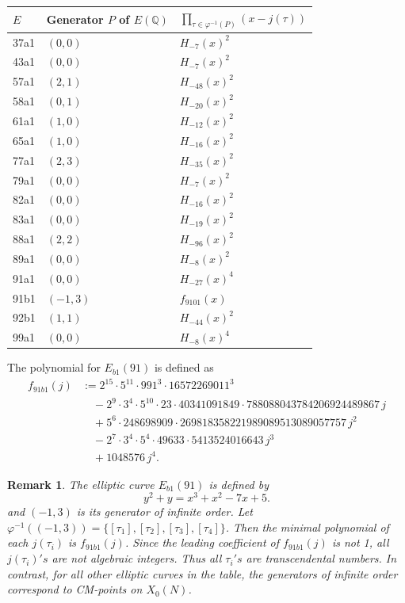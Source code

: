 \documentclass[10pt, a4paper]{article}
\newtheorem{remark}[theorem]{Remark}
\begin{document}
\begin{center}
\begin{tabular}{lll}
\toprule
$E$ & Generator $P$ of $E(\mathbb{Q})$ &$\prod\limits_{\tau  \in {\varphi ^{ - 1}}(P)} {(x - j(\tau ))} $ \\
\midrule
37a1 & $(0,0)$ & $H_{-7}(x)^2$ \\
43a1 & $(0,0)$ & $H_{-7}(x)^2$ \\
57a1 & $(2,1)$ & $H_{-48}(x)^2$ \\
58a1 & $(0,1)$ & $H_{-20}(x)^2$ \\
61a1 & $(1,0)$ & $H_{-12}(x)^2$ \\
65a1 & $(1,0)$ & $H_{-16}(x)^2$ \\
77a1 & $(2,3)$ & $H_{-35}(x)^2$ \\
79a1 & $(0,0)$ & $H_{-7}(x)^2$ \\
82a1 & $(0,0)$ & $H_{-16}(x)^2$ \\
83a1 & $(0,0)$ & $H_{-19}(x)^2$ \\
88a1 & $(2,2)$ & $H_{-96}(x)^2$ \\
89a1 & $(0,0)$ & $H_{-8}(x)^2$ \\
91a1 & $(0,0)$ & $H_{-27}(x)^4$ \\
91b1 & $(-1,3)$ & $f_{9101}(x)$ \\
92b1 & $(1,1)$ & $H_{-44}(x)^2$ \\
99a1 & $(0,0)$ & $H_{-8}(x)^4$ \\
\bottomrule
\end{tabular}
\end{center}
The polynomial for  $E_{b1}(91)$ is defined as
\begin{align*}
f_{91b1}(j) &:= 2^{15} \cdot 5^{11} \cdot 991^3 \cdot 16572269011^3 \\
&\quad - 2^9 \cdot 3^4 \cdot 5^{10} \cdot 23 \cdot 40341091849 \cdot 788088043784206924489867 \, j \\
&\quad + 5^6 \cdot 248698909 \cdot 269818358221989089513089057757 \, j^2 \\
&\quad - 2^7 \cdot 3^4 \cdot 5^4 \cdot 49633 \cdot 5413524016643 \, j^3 \\
&\quad + 1048576 \, j^4.
\end{align*}

\begin{remark}
The elliptic curve $E_{b1}(91)$  is defined by
\[
y^2 + y = x^3 + x^2 - 7x + 5.
\]
and  $(-1,3)$ is its generator of infinite order.
Let $\varphi^{-1}((-1,3)) = \{[\tau_1], [\tau_2], [\tau_3], [\tau_4]\}$. Then the minimal polynomial of each $j(\tau_i)$ is $f_{91b1}(j)$. Since the leading coefficient of $f_{91b1}(j)$ is not 1, all $j(\tau_i)'s$ are not algebraic integers. Thus all  $\tau_i 's$ are transcendental numbers.
In contrast, for all other elliptic curves in the table, the generators of infinite order correspond to  CM-points  on $X_0(N)$.
\end{remark}
\end{document}
